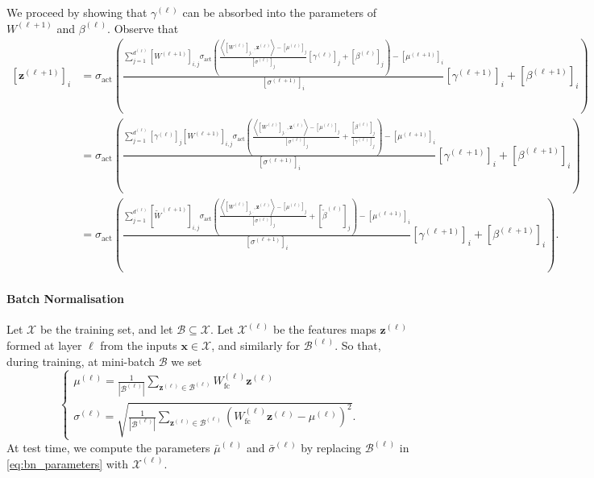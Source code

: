 \begin{tproof}
    We proceed by showing that $\gamma^{(\ell)}$ can be absorbed into the parameters of $W^{(\ell+1)}$ and $\beta^{(\ell)}$. Observe that
    \begin{align*}
        \left[\mathbf{z}^{(\ell+1)}\right]_i&=\sigma_{\text{act}}\left(\frac{\sum_{j=1}^{d^{(\ell)}}\left[W^{(\ell+1)}\right]_{i,j}\sigma_{\text{act}}\left(\frac{\left\langle\left[W^{(\ell)}\right]_{j,\cdot},\mathbf{z}^{(\ell)}\right\rangle-\left[\mu^{(\ell)}\right]_j}{\left[\sigma^{(\ell)}\right]_j}\left[\gamma^{(\ell)}\right]_j+\left[\beta^{(\ell)}\right]_j\right)-\left[\mu^{(\ell+1)}\right]_i}{\left[\sigma^{(\ell+1)}\right]_i}\left[\gamma^{(\ell+1)}\right]_i+\left[\beta^{(\ell+1)}\right]_i\right)\\&=\sigma_{\text{act}}\left(\frac{\sum_{j=1}^{d^{(\ell)}}\left[\gamma^{(\ell)}\right]_j\left[W^{(\ell+1)}\right]_{i,j}\sigma_{\text{act}}\left(\frac{\left\langle\left[W^{(\ell)}\right]_{j,\cdot},\mathbf{z}^{(\ell)}\right\rangle-\left[\mu^{(\ell)}\right]_j}{\left[\sigma^{(\ell)}\right]_j}+\frac{\left[\beta^{(\ell)}\right]_j}{\left[\gamma^{(\ell)}\right]_j}\right)-\left[\mu^{(\ell+1)}\right]_i}{\left[\sigma^{(\ell+1)}\right]_i}\left[\gamma^{(\ell+1)}\right]_i+\left[\beta^{(\ell+1)}\right]_i\right)\\&=\sigma_{\text{act}}\left(\frac{\sum_{j=1}^{d^{(\ell)}}\left[\tilde{W}^{(\ell+1)}\right]_{i,j}\sigma_{\text{act}}\left(\frac{\left\langle\left[W^{(\ell)}\right]_{j,\cdot},\mathbf{z}^{(\ell)}\right\rangle-\left[\mu^{(\ell)}\right]_j}{\left[\sigma^{(\ell)}\right]_j}+\left[\tilde{\beta}^{(\ell)}\right]_j\right)-\left[\mu^{(\ell+1)}\right]_i}{\left[\sigma^{(\ell+1)}\right]_i}\left[\gamma^{(\ell+1)}\right]_i+\left[\beta^{(\ell+1)}\right]_i\right).
    \end{align*}
\end{tproof}

\paragraph{Batch Normalisation}

Let $\mathcal{X}$ be the training set, and let $\mathcal{B}\subseteq\mathcal{X}$. Let $\mathcal{X}^{(\ell)}$ be the features maps $\mathbf{z}^{(\ell)}$ formed at layer $\ell$ from the inputs $\mathbf{x}\in\mathcal{X}$, and similarly for $\mathcal{B}^{(\ell)}$. So that, during training, at mini-batch $\mathcal{B}$ we set 
\begin{equation}\label{eq:bn_parameters}
    \begin{cases}\mu^{(\ell)}=\frac{1}{\left\vert\mathcal{B}^{(\ell)}\right\vert}\sum_{\mathbf{z}^{(\ell)}\in\mathcal{B}^{(\ell)}}W_{\text{fc}}^{(\ell)}\mathbf{z}^{(\ell)}\\\sigma^{(\ell)}=\sqrt{\frac{1}{\left\vert\mathcal{B}^{(\ell)}\right\vert}\sum_{\mathbf{z}^{(\ell)}\in\mathcal{B}^{(\ell)}}\left(W_{\text{fc}}^{(\ell)}\mathbf{z}^{(\ell)}-\mu^{(\ell)}\right)^2}.\end{cases}
\end{equation}
At test time, we compute the parameters $\bar{\mu}^{(\ell)}$ and $\bar{\sigma}^{(\ell)}$ by replacing $\mathcal{B}^{(\ell)}$ in \eqref{eq:bn_parameters} with $\mathcal{X}^{(\ell)}$.

